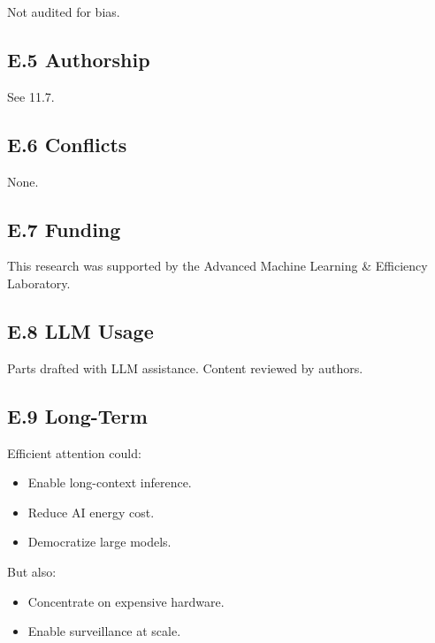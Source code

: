 Not audited for bias.

\subsection{E.5 Authorship}

See  11.7.

\subsection{E.6 Conflicts}

None.

\subsection{E.7 Funding}

This research was supported by the Advanced Machine Learning \& Efficiency Laboratory.

\subsection{E.8 LLM Usage}

Parts drafted with LLM assistance. Content reviewed by authors.

\subsection{E.9 Long-Term}

Efficient attention could:
\begin{itemize}
\item Enable long-context inference.
\item Reduce AI energy cost.
\item Democratize large models.

\end{itemize}
But also:
\begin{itemize}
\item Concentrate on expensive hardware.
\item Enable surveillance at scale.

\end{itemize}
